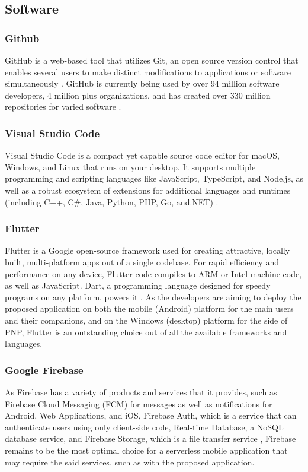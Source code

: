 \subsection{Software}

\subsubsection{Github}
GitHub is a web-based tool that utilizes Git, an open source version control that enables several users to make distinct modifications to applications or software simultaneously \cite{digitalGovGitHub}. GitHub is currently being used by over 94 million software developers, 4 million plus organizations, and has created over 330 million repositories for varied software \cite{github}.

\subsubsection{Visual Studio Code}
Visual Studio Code is a compact yet capable source code editor for macOS, Windows, and Linux that runs on your desktop. It supports multiple programming and scripting languages like JavaScript, TypeScript, and Node.js, as well as a robust ecosystem of extensions for additional languages and runtimes (including C++, C\#, Java, Python, PHP, Go, and.NET) \cite{microsoft_2021}.

\subsubsection{Flutter}
Flutter is a Google open-source framework used for creating attractive, locally built, multi-platform apps out of a single codebase. For rapid efficiency and performance on any device, Flutter code compiles to ARM or Intel machine code, as well as JavaScript. Dart, a programming language designed for speedy programs on any platform, powers it \cite{flutter}. As the developers are aiming to deploy the proposed application on both the mobile (Android) platform for the main users and their companions, and on the Windows (desktop)  platform for the side of PNP, Flutter is an outstanding choice out of all the available frameworks and languages.

\subsubsection{Google Firebase}
As Firebase has a variety of products and services that it provides, such as Firebase Cloud Messaging (FCM) for messages as well as notifications for Android, Web Applications, and iOS, Firebase Auth, which is a service that can authenticate users using only client-side code, Real-time Database, a NoSQL database service, and Firebase Storage, which is a file transfer service \cite{khawas2018application}, Firebase remains to be the most optimal choice for a serverless mobile application that may require the said services, such as with the proposed application.

